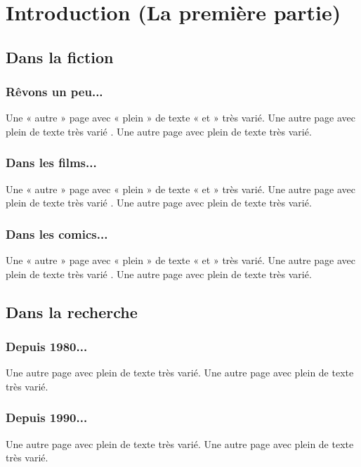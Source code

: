 
\part{Introduction (La première partie)}
\label{PARTIE_1_INTRODUCTION}

\minitoc

    \chapter{Dans la fiction}

        \section{Rêvons un peu...}
            Une « autre » page avec « plein » de texte « et » très varié.
            Une autre page avec plein de texte très varié .
            Une autre page avec plein de texte très varié.

        \section{Dans les films...}
            Une « autre » page avec « plein » de texte « et » très varié.
            Une autre page avec plein de texte très varié .
            Une autre page avec plein de texte très varié.

        \section{Dans les comics...}
            Une « autre » page avec « plein » de texte « et » très varié.
            Une autre page avec plein de texte très varié .
            Une autre page avec plein de texte très varié.

    \chapter{Dans la recherche}

        \section{Depuis 1980...}
            Une autre page avec plein de texte très varié.
            Une autre page avec plein de texte très varié.

        \section{Depuis 1990...}
            Une autre page avec plein de texte très varié.
            Une autre page avec plein de texte très varié.

